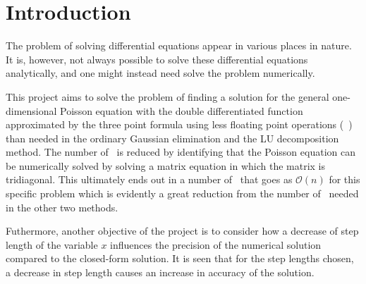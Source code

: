 \chapter{Introduction}

The problem of solving differential equations appear in various places in nature. 
It is, however, not always possible to solve these differential equations analytically, and one might instead need solve the problem numerically. 

This project aims to solve the problem of finding a solution for the general one-dimensional Poisson equation with the double differentiated function approximated by the three point formula using less floating point operations (\flops\ ) than needed in the ordinary Gaussian elimination and the LU decomposition method. 
The number of \flops \, is reduced by identifying that the Poisson equation can be numerically solved by solving a matrix equation in which the matrix is tridiagonal. 
This ultimately ends out in a number of \flops \, that goes as $\mathcal{O}(n)$ for this specific problem which is evidently a great reduction from the number of \flops \, needed in the other two methods.

Futhermore, another objective of the project is to consider how a decrease of step length of the variable $x$ influences the precision of the numerical solution compared to the closed-form solution. 
It is seen that for the step lengths chosen, a decrease in step length causes an increase in accuracy of the solution.   

